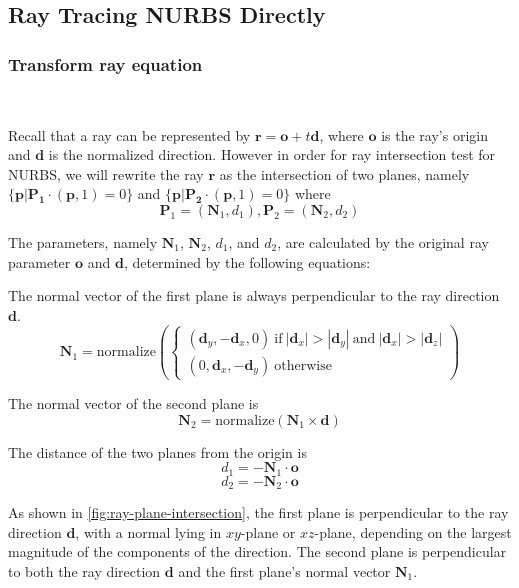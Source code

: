 \documentclass[acmtog]{acmart}
\begin{document}
\subsection{Ray Tracing NURBS Directly}

\subsubsection{Transform ray equation}
\ 

Recall that a ray can be represented by $\mathbf{r} = \mathbf{o} + t \mathbf{d}$, where $\mathbf{o}$ is the ray's origin and $\mathbf{d}$ is the normalized direction. However in order for ray intersection test for NURBS, we will rewrite the ray $\mathbf{r}$ as the intersection of two planes, namely $\{ \mathbf{p} | \mathbf{P_1} \cdot (\mathbf{p}, 1) = 0 \}$ and $\{ \mathbf{p} | \mathbf{P_2} \cdot (\mathbf{p}, 1) = 0 \}$ where 
\[
	\mathbf{P}_1 = (\mathbf{N}_1, d_1), 
	\mathbf{P}_2 = (\mathbf{N}_2, d_2)	
\]

The parameters, namely $\mathbf{N}_1$, $\mathbf{N}_2$, $d_1$, and $d_2$, are calculated by the original ray parameter $\mathbf{o}$ and $\mathbf{d}$, determined by the following equations:

The normal vector of the first plane is always perpendicular to the ray direction $\mathbf{d}$.  
\[
	\mathbf{N}_1 = \mathrm{normalize}\left( \begin{cases}
		\left(\mathbf{d}_y, -\mathbf{d}_x, 0\right)
		\mathrm{\ if\ } |\mathbf{d}_x| > |\mathbf{d}_y| \mathrm{\ and\ } |\mathbf{d}_x| > |\mathbf{d}_z| \\
		\left(0, \mathbf{d}_x, -\mathbf{d}_y\right)
		\mathrm{\ otherwise}
	\end{cases}	\right)
\]

The normal vector of the second plane is 
\[
	\mathbf{N}_2 = \mathrm{normalize}\left( \mathbf{N}_1 \times \mathbf{d} \right)
\]

The distance of the two planes from the origin is
\[
	d_1 = -\mathbf{N}_1 \cdot \mathbf{o}	
\]
\[
	d_2 = -\mathbf{N}_2 \cdot \mathbf{o}	
\]

As shown in \ref{fig:ray-plane-intersection}, the first plane is perpendicular to the ray direction $\mathbf{d}$, with a normal lying in $xy$-plane or $xz$-plane, depending on the largest magnitude of the components of the direction. The second plane is perpendicular to both the ray direction $\mathbf{d}$ and the first plane's normal vector $\mathbf{N}_1$.
\end{document}
